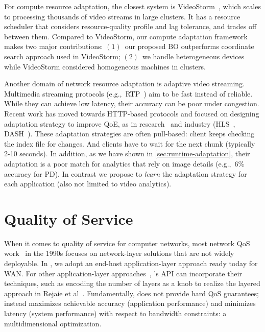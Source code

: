 \documentclass[thesis.tex]{subfiles}
\begin{document}
For compute resource adaptation, the closest system is
VideoStorm~\cite{zhang2017live}, which scales to processing thousands of video
streams in large clusters. It has a resource scheduler that considers
resource-quality profile and lag tolerance, and trades off between
them. Compared to VideoStorm, our compute adaptation framework makes two major
contributions: $(1)$~our proposed BO outperforms coordinate search approach used
in VideoStorm; $(2)$~we handle heterogeneous devices while VideoStorm considered
homogeneous machines in clusters.

Another domain of network resource adaptation is adaptive video
streaming. Multimedia streaming protocols (e.g.,~RTP~\cite{schulzrinne2006rtp})
aim to be fast instead of reliable. While they can achieve low latency, their
accuracy can be poor under congestion.  Recent work has moved towards HTTP-based
protocols and focused on designing adaptation strategy to improve QoE, as in
research~\cite{mao2017neural, sun2016cs2p, yin2015control} and industry
(HLS~\cite{pantos2016http}, DASH~\cite{michalos2012dynamic,
  sodagar2011mpeg}). These adaptation strategies are often pull-based: client
keeps checking the index file for changes. And clients have to wait for the next
chunk (typically 2-10 seconds). In addition, as we have shown in
\autoref{sec:runtime-adaptation}, their adaptation is a poor match for analytics
that rely on image details (e.g.,~6\% accuracy for PD). In contrast we propose
to \emph{learn} the adaptation strategy for each application (also not limited
to video analytics).

\section{Quality of Service}
\label{sec:quality-service}

When it comes to quality of service for computer networks, most network QoS
work~\cite{ferrari1990scheme, shenker1994integrated, shenker1995fundamental} in
the 1990s focuses on network-layer solutions that are not widely deployable. In
\awstream{}, we adopt an end-host application-layer approach ready today for
WAN. For other application-layer approaches~\cite{vandalore2001survey},
\awstream{}'s API can incorporate their techniques, such as encoding the number
of layers as a knob to realize the layered approach in Rejaie et
al~\cite{rejaie2000layered}. Fundamentally, \awstream{} does not provide hard
QoS guarantees; instead \awstream{} maximizes achievable accuracy (application
performance) and minimizes latency (system performance) with respect to
bandwidth constraints: a multidimensional optimization.
\end{document}
